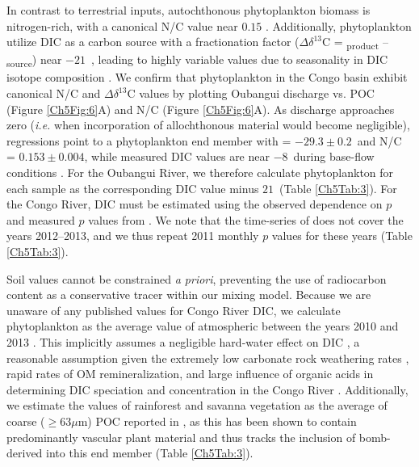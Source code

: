 In contrast to terrestrial inputs, autochthonous phytoplankton biomass is nitrogen-rich, with a canonical N/C value near $0.15$ \citep{Anderson:1994vb}. Additionally, phytoplankton utilize DIC as a carbon source with a fractionation factor ($\Delta\delta^{13}$C = \textsubscript{product} -- \textsubscript{source}) near $-21$\textperthousand\ \citep{Rau:1989wr}, leading to highly variable  values due to seasonality in DIC isotope composition \citep{Bouillon:2014ko}. We confirm that phytoplankton in the Congo basin exhibit canonical N/C and $\Delta\delta^{13}$C values by plotting Oubangui discharge vs. POC  (Figure \ref{Ch5Fig:6}A) and N/C (Figure \ref{Ch5Fig:6}A). As discharge approaches zero (\textit{i.e.} when incorporation of allochthonous material would become negligible), regressions point to a phytoplankton end member with  = $-29.3 \pm 0.2$\textperthousand\ and N/C = $0.153 \pm 0.004$, while measured DIC  values are near $-8$\textperthousand\ during base-flow conditions \citep{Bouillon:2012cw}. For the Oubangui River, we therefore calculate phytoplankton  for each sample as the corresponding DIC  value minus $21$\textperthousand\ (Table \ref{Ch5Tab:3}). For the Congo River, DIC  must be estimated using the observed dependence on $p$ \citep{Bouillon:2014ko} and measured $p$ values from \citet{Wang:2013js}. We note that the time-series of \citet{Wang:2013js} does not cover the years 2012--2013, and we thus repeat 2011 monthly $p$ values for these years (Table \ref{Ch5Tab:3}).

Soil  values cannot be constrained \textit{a priori}, preventing the use of radiocarbon content as a conservative tracer within our mixing model. Because we are unaware of any published  values for Congo River DIC, we calculate phytoplankton  as the average value of atmospheric  between the years 2010 and 2013 \citep{Graven:2015he}. This implicitly assumes a negligible hard-water effect on DIC , a reasonable assumption given the extremely low carbonate rock weathering rates \citep[$0.017$ tC km\textsuperscript{-2} yr\textsuperscript{-1};][]{Copard:2007bf}, rapid rates of OM remineralization, and large influence of organic acids in determining DIC speciation and concentration in the Congo River \citep{Wang:2013js}. Additionally, we estimate the  values of rainforest and savanna vegetation as the average of coarse ($\geq 63 \mu$m) POC reported in \citet{Spencer:2012en}, as this has been shown to contain predominantly vascular plant material and thus tracks the inclusion of bomb-derived  into this end member (Table \ref{Ch5Tab:3}).


